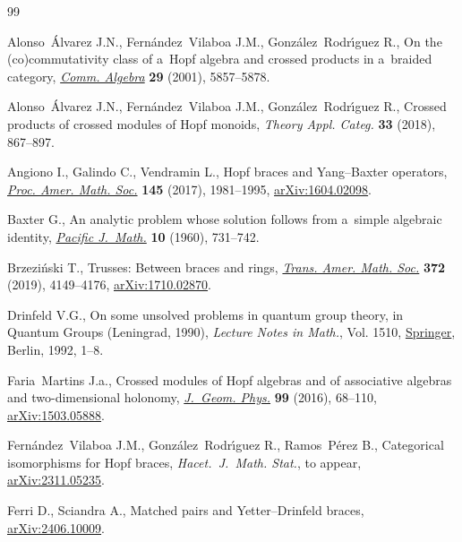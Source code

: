 \begin{thebibliography}{99}
\footnotesize\itemsep=0pt

Alonso~\'Alvarez J.N., Fern\'andez~Vilaboa J.M., Gonz\'alez~Rodr\'{\i}guez R.,
 On the (co)commutativity class of a~{H}opf algebra and crossed products in
 a~braided category, \href{https://doi.org/10.1081/AGB-100107962}{\textit{Comm. Algebra}} \textbf{29} (2001), 5857--5878.

Alonso~\'Alvarez J.N., Fern\'andez~Vilaboa J.M., Gonz\'alez~Rodr\'{\i}guez R.,
 Crossed products of crossed modules of {H}opf monoids, \textit{Theory Appl.
 Categ.} \textbf{33} (2018), 867--897.

Angiono I., Galindo C., Vendramin L., Hopf braces and {Y}ang--{B}axter
 operators, \href{https://doi.org/10.1090/proc/13395}{\textit{Proc. Amer. Math. Soc.}} \textbf{145} (2017), 1981--1995,
 \href{https://arxiv.org/abs/1604.02098}{arXiv:1604.02098}.

Baxter G., An analytic problem whose solution follows from a~simple algebraic
 identity, \href{https://doi.org/10.2140/pjm.1960.10.731}{\textit{Pacific J.~Math.}} \textbf{10} (1960), 731--742.

Brzezi\'nski T., Trusses: {B}etween braces and rings, \href{https://doi.org/10.1090/tran/7705}{\textit{Trans. Amer.
 Math. Soc.}} \textbf{372} (2019), 4149--4176, \href{https://arxiv.org/abs/1710.02870}{arXiv:1710.02870}.

Drinfeld V.G., On some unsolved problems in quantum group theory, in Quantum
 Groups ({L}eningrad, 1990), \textit{Lecture Notes in Math.}, Vol. 1510,
 \href{https://doi.org/10.1007/BFb0101175}{Springer}, Berlin, 1992, 1--8.

Faria~Martins J.a., Crossed modules of {H}opf algebras and of associative
 algebras and two-dimensional holonomy, \href{https://doi.org/10.1016/j.geomphys.2015.09.012}{\textit{J.~Geom. Phys.}} \textbf{99}
 (2016), 68--110, \href{https://arxiv.org/abs/1503.05888}{arXiv:1503.05888}.

Fern\'andez~Vilaboa J.M., Gonz\'alez~Rodr\'{\i}guez R., Ramos~P\'erez B.,
 Categorical isomorphisms for Hopf braces, \textit{Hacet.~J.~Math. Stat.}, {t}o
 appear, \href{https://arxiv.org/abs/2311.05235}{arXiv:2311.05235}.

Ferri D., Sciandra A., Matched pairs and {Y}etter--{D}rinfeld braces,
 \href{https://arxiv.org/abs/2406.10009}{arXiv:2406.10009}.


\end{thebibliography}
